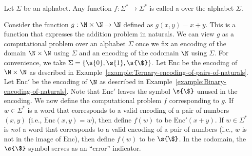 \begin{flex}
\begin{definition} \label{definition:Computational-problem}
Let $\Sigma$ be an alphabet. Any function $f: \Sigma^* \to \Sigma^*$ is called a  over the alphabet $\Sigma$. 
\end{definition}

\begin{example} \label{example:Addition-as-a-computational-problem}
Consider the function $g:\N \times \N \to \N$ defined as $g(x, y) = x + y$. 
This is a function that expresses the addition problem in naturals. 
We can view $g$ as a computational problem over an alphabet $\Sigma$ once we fix an encoding of the domain $\N \times \N$ using $\Sigma$ and an encoding of the codomain $\N$ using $\Sigma$. 
For convenience, we take $\Sigma = \{\s{0},\s{1},\s{\$}\}$. Let $\text{Enc}$ be the encoding of $\N \times \N$ as described in Example~\ref{example:Ternary-encoding-of-pairs-of-naturals}. 
Let $\text{Enc}'$ be the encoding of $\N$ as described in Example~\ref{example:Binary-encoding-of-naturals}. 
Note that $\text{Enc}'$ leaves the symbol $\s{\$}$ unused in the encoding. 
We now define the computational problem $f$ corresponding to $g$. 
If $w \in \Sigma^*$ is a word that corresponds to a valid encoding of a pair of numbers $(x, y)$ (i.e., $\text{Enc}(x,y) = w$), then define $f(w)$ to be $\text{Enc}'(x+y)$. 
If $w \in \Sigma^*$ is \emph{not} a word that corresponds to a valid encoding of a pair of numbers (i.e., $w$ is not in the image of $\text{Enc}$), then define $f(w)$ to be $\s{\$}$. 
In the codomain, the $\s{\$}$ symbol serves as an ``error'' indicator.
\end{example}
\end{flex}


